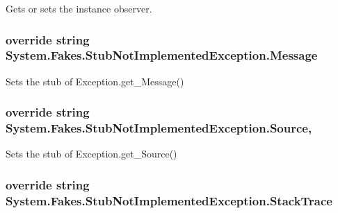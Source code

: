Gets or sets the instance observer.

\hypertarget{class_system_1_1_fakes_1_1_stub_not_implemented_exception_a7462a3b32d7a5ebf8eb8355153eb0ca5}{
\subsubsection[{Message}]{\setlength{\rightskip}{0pt plus 5cm}override string System.\-Fakes.\-Stub\-Not\-Implemented\-Exception.\-Message\hspace{0.3cm}{\ttfamily [get]}}}\label{class_system_1_1_fakes_1_1_stub_not_implemented_exception_a7462a3b32d7a5ebf8eb8355153eb0ca5}


Sets the stub of Exception.\-get\-\_\-\-Message()

\hypertarget{class_system_1_1_fakes_1_1_stub_not_implemented_exception_a4bc56d57a05ea403cdf545813ee6ff53}{
\subsubsection[{Source}]{\setlength{\rightskip}{0pt plus 5cm}override string System.\-Fakes.\-Stub\-Not\-Implemented\-Exception.\-Source\hspace{0.3cm}{\ttfamily [get]}, {\ttfamily [set]}}}\label{class_system_1_1_fakes_1_1_stub_not_implemented_exception_a4bc56d57a05ea403cdf545813ee6ff53}


Sets the stub of Exception.\-get\-\_\-\-Source()

\hypertarget{class_system_1_1_fakes_1_1_stub_not_implemented_exception_a8975f1cc226f3af4b02bbb95f8d48e36}{
\subsubsection[{Stack\-Trace}]{\setlength{\rightskip}{0pt plus 5cm}override string System.\-Fakes.\-Stub\-Not\-Implemented\-Exception.\-Stack\-Trace\hspace{0.3cm}{\ttfamily [get]}}}\label{class_system_1_1_fakes_1_1_stub_not_implemented_exception_a8975f1cc226f3af4b02bbb95f8d48e36}


